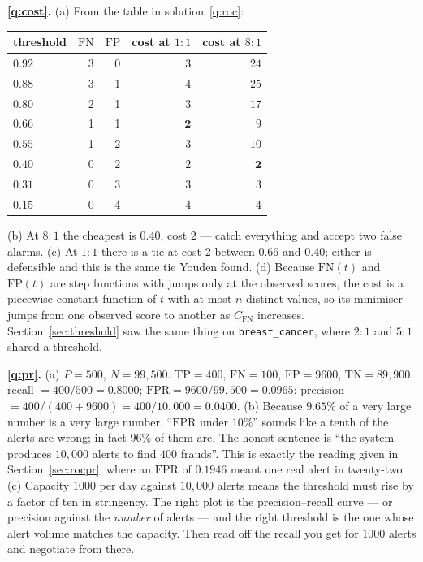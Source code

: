 \documentclass[11pt]{article}
\newcommand{\TP}{\mathrm{TP}}
\newcommand{\FP}{\mathrm{FP}}
\newcommand{\TN}{\mathrm{TN}}
\newcommand{\FN}{\mathrm{FN}}
\newcommand{\FPR}{\mathrm{FPR}}
\begin{document}
\medskip
\textbf{\ref{q:cost}.} (a) From the table in solution~\ref{q:roc}:
\begin{center}\small
\begin{tabular}{@{}lrrrr@{}}
\toprule
threshold & $\FN$ & $\FP$ & cost at $1\!:\!1$ & cost at $8\!:\!1$\\
\midrule
$0.92$ & 3 & 0 & $3$ & $24$\\
$0.88$ & 3 & 1 & $4$ & $25$\\
$0.80$ & 2 & 1 & $3$ & $17$\\
$\mathbf{0.66}$ & 1 & 1 & $\mathbf{2}$ & $9$\\
$0.55$ & 1 & 2 & $3$ & $10$\\
$\mathbf{0.40}$ & 0 & 2 & $2$ & $\mathbf{2}$\\
$0.31$ & 0 & 3 & $3$ & $3$\\
$0.15$ & 0 & 4 & $4$ & $4$\\
\bottomrule
\end{tabular}
\end{center}
(b) At $8\!:\!1$ the cheapest is $\mathbf{0.40}$, cost $2$ --- catch everything
and accept two false alarms.
(c) At $1\!:\!1$ there is a tie at cost $2$ between $0.66$ and $0.40$; either is
defensible and this is the same tie Youden found.
(d) Because $\FN(t)$ and $\FP(t)$ are step functions with jumps only at the
observed scores, the cost is a piecewise-constant function of $t$ with at most
$n$ distinct values, so its minimiser jumps from one observed score to another
as $C_{\FN}$ increases. Section~\ref{sec:threshold} saw the same thing on
\texttt{breast\_cancer}, where $2\!:\!1$ and $5\!:\!1$ shared a threshold.

\medskip
\textbf{\ref{q:pr}.} (a) $P = 500$, $N = 99{,}500$. $\TP = 400$, $\FN = 100$,
$\FP = 9600$, $\TN = 89{,}900$. recall $= 400/500 = \mathbf{0.8000}$;
$\FPR = 9600/99{,}500 = \mathbf{0.0965}$;
precision $= 400/(400 + 9600) = 400/10{,}000 = \mathbf{0.0400}$.
(b) Because $9.65\%$ of a very large number is a very large number. ``$\FPR$
under $10\%$'' sounds like a tenth of the alerts are wrong; in fact
$96\%$ of them are. The honest sentence is ``the system produces $10{,}000$
alerts to find $400$ frauds''. This is exactly the reading given in
Section~\ref{sec:rocpr}, where an $\FPR$ of $0.1946$ meant one real alert in
twenty-two.
(c) Capacity $1000$ per day against $10{,}000$ alerts means the threshold must
rise by a factor of ten in stringency. The right plot is the precision--recall
curve --- or precision against the \emph{number} of alerts --- and the right
threshold is the one whose alert volume matches the capacity. Then read off the
recall you get for $1000$ alerts and negotiate from there.
\end{document}
